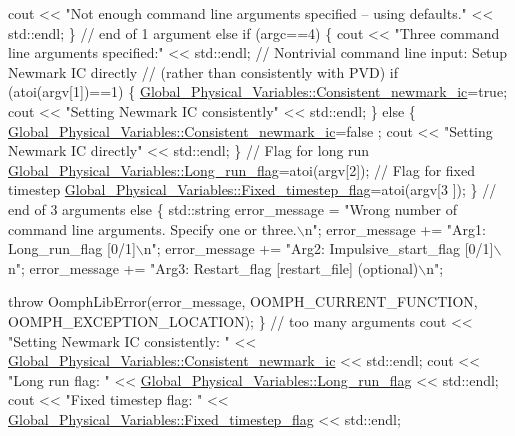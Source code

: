 \begin{DoxyCodeInclude}
{{{{   cout << \textcolor{stringliteral}{"Not enough command line arguments specified -- using defaults."} 
        << std::endl;
  \} \textcolor{comment}{// end of 1 argument}
 \textcolor{keywordflow}{else} \textcolor{keywordflow}{if} (argc==4)
  \{
   cout << \textcolor{stringliteral}{"Three command line arguments specified:"} << std::endl;
   \textcolor{comment}{// Nontrivial command line input: Setup Newmark IC directly}
   \textcolor{comment}{// (rather than consistently with PVD)}
   \textcolor{keywordflow}{if} (atoi(argv[1])==1) 
    \{
     \hyperlink{namespaceGlobal__Physical__Variables_affe3ddb0b7c1d7dbf3955738edbda1af}{Global\_Physical\_Variables::Consistent\_newmark\_ic}=\textcolor{keyword}{true};
     cout << \textcolor{stringliteral}{"Setting Newmark IC consistently"} << std::endl;
    \}
   \textcolor{keywordflow}{else}
    \{
     \hyperlink{namespaceGlobal__Physical__Variables_affe3ddb0b7c1d7dbf3955738edbda1af}{Global\_Physical\_Variables::Consistent\_newmark\_ic}=\textcolor{keyword}{false}
      ;
     cout << \textcolor{stringliteral}{"Setting Newmark IC directly"} << std::endl;
    \}
   \textcolor{comment}{// Flag for long run}
   \hyperlink{namespaceGlobal__Physical__Variables_acb18f0e4952b6a1b0840ca94828ace3b}{Global\_Physical\_Variables::Long\_run\_flag}=atoi(argv[2]);
   \textcolor{comment}{// Flag for fixed timestep}
   \hyperlink{namespaceGlobal__Physical__Variables_aae2e69454e5e73519e13dd3424d41a2c}{Global\_Physical\_Variables::Fixed\_timestep\_flag}=atoi(argv[3
      ]);
  \} \textcolor{comment}{// end of 3 arguments}
 \textcolor{keywordflow}{else}
  \{
   std::string error\_message =
    \textcolor{stringliteral}{"Wrong number of command line arguments. Specify one or three.\(\backslash\)n"};
   error\_message += \textcolor{stringliteral}{"Arg1: Long\_run\_flag [0/1]\(\backslash\)n"};
   error\_message += \textcolor{stringliteral}{"Arg2: Impulsive\_start\_flag [0/1]\(\backslash\)n"};
   error\_message += \textcolor{stringliteral}{"Arg3: Restart\_flag [restart\_file] (optional)\(\backslash\)n"};

   \textcolor{keywordflow}{throw} OomphLibError(error\_message,
                       OOMPH\_CURRENT\_FUNCTION,
                       OOMPH\_EXCEPTION\_LOCATION);
  \} \textcolor{comment}{// too many arguments}
 cout << \textcolor{stringliteral}{"Setting Newmark IC consistently: "}
      <<  \hyperlink{namespaceGlobal__Physical__Variables_affe3ddb0b7c1d7dbf3955738edbda1af}{Global\_Physical\_Variables::Consistent\_newmark\_ic} 
      << std::endl;
 cout << \textcolor{stringliteral}{"Long run flag: "} 
      <<  \hyperlink{namespaceGlobal__Physical__Variables_acb18f0e4952b6a1b0840ca94828ace3b}{Global\_Physical\_Variables::Long\_run\_flag} << std::endl;
 cout << \textcolor{stringliteral}{"Fixed timestep flag: "} 
      <<  \hyperlink{namespaceGlobal__Physical__Variables_aae2e69454e5e73519e13dd3424d41a2c}{Global\_Physical\_Variables::Fixed\_timestep\_flag} << 
      std::endl;

}}}}
\end{DoxyCodeInclude}
